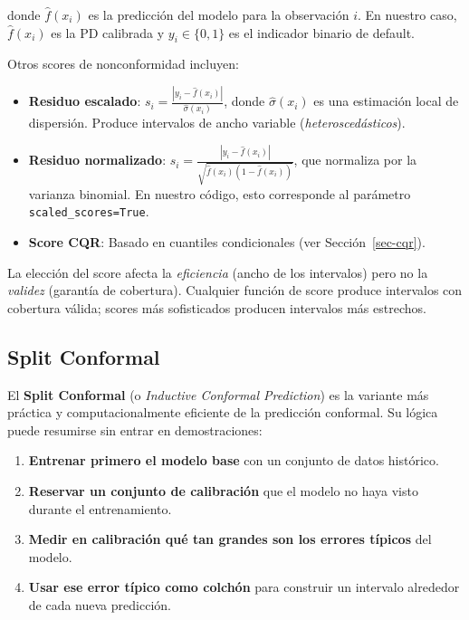 \documentclass[
  spanish,
  11pt,
  letterpaper,
]{scrbook}
\providecommand{\tightlist}{%
  \setlength{\itemsep}{0pt}\setlength{\parskip}{0pt}}
\theoremstyle{plain}
\theoremstyle{remark}
\begin{document}
donde \(\hat{f}(x_i)\) es la predicción del modelo para la observación
\(i\). En nuestro caso, \(\hat{f}(x_i)\) es la PD calibrada y
\(y_i \in \{0, 1\}\) es el indicador binario de default.

Otros scores de nonconformidad incluyen:

\begin{itemize}
\tightlist
\item
  \textbf{Residuo escalado}:
  \(s_i = \frac{|y_i - \hat{f}(x_i)|}{\hat{\sigma}(x_i)}\), donde
  \(\hat{\sigma}(x_i)\) es una estimación local de dispersión. Produce
  intervalos de ancho variable (\emph{heteroscedásticos}).
\item
  \textbf{Residuo normalizado}:
  \(s_i = \frac{|y_i - \hat{f}(x_i)|}{\sqrt{\hat{f}(x_i)(1 - \hat{f}(x_i))}}\),
  que normaliza por la varianza binomial. En nuestro código, esto
  corresponde al parámetro \texttt{scaled\_scores=True}.
\item
  \textbf{Score CQR}: Basado en cuantiles condicionales (ver
  Sección~\ref{sec-cqr}).
\end{itemize}

La elección del score afecta la \emph{eficiencia} (ancho de los
intervalos) pero no la \emph{validez} (garantía de cobertura). Cualquier
función de score produce intervalos con cobertura válida; scores más
sofisticados producen intervalos más estrechos.

\subsection{Split Conformal}\label{sec-split-conformal-primer}

El \textbf{Split Conformal} (o \emph{Inductive Conformal Prediction}) es
la variante más práctica y computacionalmente eficiente de la predicción
conformal. Su lógica puede resumirse sin entrar en demostraciones:

\begin{enumerate}
\def\labelenumi{\arabic{enumi}.}
\tightlist
\item
  \textbf{Entrenar primero el modelo base} con un conjunto de datos
  histórico.
\item
  \textbf{Reservar un conjunto de calibración} que el modelo no haya
  visto durante el entrenamiento.
\item
  \textbf{Medir en calibración qué tan grandes son los errores típicos}
  del modelo.
\item
  \textbf{Usar ese error típico como colchón} para construir un
  intervalo alrededor de cada nueva predicción.
\end{enumerate}
\end{document}

